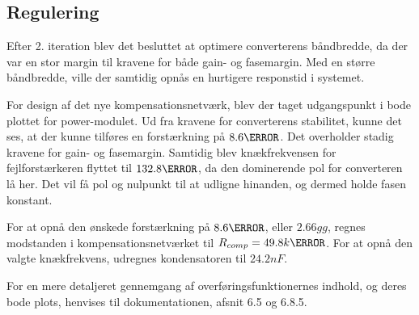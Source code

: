 
\subsection{Regulering}
Efter 2. iteration blev det besluttet at optimere converterens båndbredde, da der var en stor margin til kravene for både gain- og fasemargin. Med en større båndbredde, ville der samtidig opnås en hurtigere responstid i systemet. 

For design af det nye kompensationsnetværk, blev der taget udgangspunkt i bode plottet for power-modulet. Ud fra kravene for converterens stabilitet, kunne det ses, at der kunne tilføres en forstærkning på $8.6\decibel$. Det overholder stadig kravene for gain- og fasemargin. Samtidig blev knækfrekvensen for fejlforstærkeren flyttet til $132.8\hertz$, da den dominerende pol for converteren lå her. Det vil få pol og nulpunkt til at udligne hinanden, og dermed holde fasen konstant. 

For at opnå den ønskede forstærkning på $8.6\decibel$, eller $2.66gg$, regnes modstanden i kompensationsnetværket til $R_{comp} = 49.8k\ohm$. For at opnå den valgte knækfrekvens, udregnes kondensatoren til $24.2nF$. 

For en mere detaljeret gennemgang af overføringsfunktionernes indhold, og deres bode plots, henvises til dokumentationen, afsnit 6.5 og 6.8.5.
